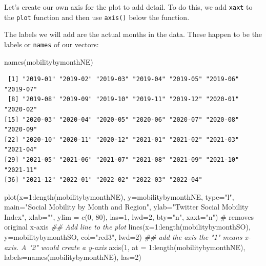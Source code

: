 \documentclass[
  letterpaper,
  DIV=11,
  numbers=noendperiod]{scrreprt}
\newenvironment{Shaded}{\begin{snugshade}}{\end{snugshade}}
\newcommand{\AttributeTok}[1]{\textcolor[rgb]{0.40,0.45,0.13}{#1}}
\newcommand{\CommentTok}[1]{\textcolor[rgb]{0.37,0.37,0.37}{#1}}
\newcommand{\DecValTok}[1]{\textcolor[rgb]{0.68,0.00,0.00}{#1}}
\newcommand{\DocumentationTok}[1]{\textcolor[rgb]{0.37,0.37,0.37}{\textit{#1}}}
\newcommand{\FunctionTok}[1]{\textcolor[rgb]{0.28,0.35,0.67}{#1}}
\newcommand{\NormalTok}[1]{\textcolor[rgb]{0.00,0.23,0.31}{#1}}
\newcommand{\SpecialCharTok}[1]{\textcolor[rgb]{0.37,0.37,0.37}{#1}}
\newcommand{\StringTok}[1]{\textcolor[rgb]{0.13,0.47,0.30}{#1}}
\begin{document}
Let's create our own axis for the plot to add detail. To do this, we add
\texttt{xaxt} to the \texttt{plot} function and then use \texttt{axis()}
below the function.

The labels we will add are the actual months in the data. These happen
to be the labels or \texttt{names} of our vectors:

\begin{Shaded}
\begin{Highlighting}[]
\FunctionTok{names}\NormalTok{(mobilitybymonthNE)}
\end{Highlighting}
\end{Shaded}

\begin{verbatim}
 [1] "2019-01" "2019-02" "2019-03" "2019-04" "2019-05" "2019-06" "2019-07"
 [8] "2019-08" "2019-09" "2019-10" "2019-11" "2019-12" "2020-01" "2020-02"
[15] "2020-03" "2020-04" "2020-05" "2020-06" "2020-07" "2020-08" "2020-09"
[22] "2020-10" "2020-11" "2020-12" "2021-01" "2021-02" "2021-03" "2021-04"
[29] "2021-05" "2021-06" "2021-07" "2021-08" "2021-09" "2021-10" "2021-11"
[36] "2021-12" "2022-01" "2022-02" "2022-03" "2022-04"
\end{verbatim}

\begin{Shaded}
\begin{Highlighting}[]
\FunctionTok{plot}\NormalTok{(}\AttributeTok{x=}\DecValTok{1}\SpecialCharTok{:}\FunctionTok{length}\NormalTok{(mobilitybymonthNE),}
     \AttributeTok{y=}\NormalTok{mobilitybymonthNE,}
     \AttributeTok{type=}\StringTok{"l"}\NormalTok{, }
     \AttributeTok{main=}\StringTok{"Social Mobility by Month and Region"}\NormalTok{,}
     \AttributeTok{ylab=}\StringTok{"Twitter Social Mobility Index"}\NormalTok{,}
     \AttributeTok{xlab=}\StringTok{""}\NormalTok{,}
     \AttributeTok{ylim =} \FunctionTok{c}\NormalTok{(}\DecValTok{0}\NormalTok{, }\DecValTok{80}\NormalTok{),}
     \AttributeTok{las=}\DecValTok{1}\NormalTok{, }
     \AttributeTok{lwd=}\DecValTok{2}\NormalTok{, }
     \AttributeTok{bty=}\StringTok{"n"}\NormalTok{,}
     \AttributeTok{xaxt=}\StringTok{"n"}\NormalTok{) }\CommentTok{\# removes original x{-}axis}
\DocumentationTok{\#\# Add line to the plot }
\FunctionTok{lines}\NormalTok{(}\AttributeTok{x=}\DecValTok{1}\SpecialCharTok{:}\FunctionTok{length}\NormalTok{(mobilitybymonthSO),}
     \AttributeTok{y=}\NormalTok{mobilitybymonthSO, }\AttributeTok{col=}\StringTok{"red3"}\NormalTok{, }\AttributeTok{lwd=}\DecValTok{2}\NormalTok{)}
\DocumentationTok{\#\# add the axis the "1" means x{-}axis. A "2" would create a y{-}axis}
\FunctionTok{axis}\NormalTok{(}\DecValTok{1}\NormalTok{, }\AttributeTok{at =} \DecValTok{1}\SpecialCharTok{:}\FunctionTok{length}\NormalTok{(mobilitybymonthNE), }
     \AttributeTok{labels=}\FunctionTok{names}\NormalTok{(mobilitybymonthNE), }\AttributeTok{las=}\DecValTok{2}\NormalTok{)}
\end{Highlighting}
\end{Shaded}
\end{document}
